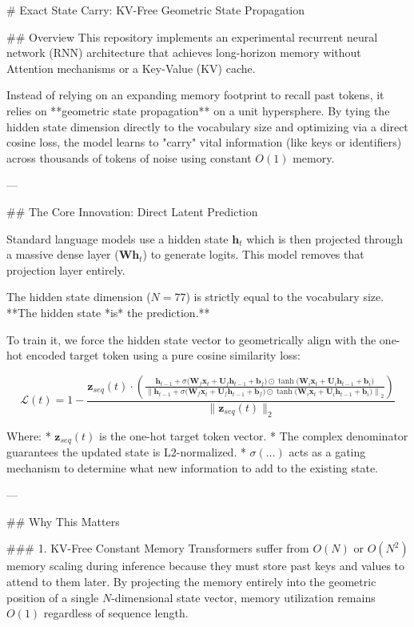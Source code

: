 # Exact State Carry: KV-Free Geometric State Propagation

## Overview
This repository implements an experimental recurrent neural network (RNN) architecture that achieves long-horizon memory without Attention mechanisms or a Key-Value (KV) cache. 

Instead of relying on an expanding memory footprint to recall past tokens, it relies on **geometric state propagation** on a unit hypersphere. By tying the hidden state dimension directly to the vocabulary size and optimizing via a direct cosine loss, the model learns to "carry" vital information (like keys or identifiers) across thousands of tokens of noise using constant $O(1)$ memory.

---

## The Core Innovation: Direct Latent Prediction

Standard language models use a hidden state $\mathbf{h}_t$ which is then projected through a massive dense layer ($\mathbf{W} \mathbf{h}_t$) to generate logits. This model removes that projection layer entirely. 

The hidden state dimension ($N=77$) is strictly equal to the vocabulary size. **The hidden state *is* the prediction.** 

To train it, we force the hidden state vector to geometrically align with the one-hot encoded target token using a pure cosine similarity loss:

$$ \mathcal{L}(t) = 1 - \frac{\mathbf{z}_{seq}(t) \cdot \left( \frac{\mathbf{h}_{t-1} + \sigma\Big( \mathbf{W}_f \mathbf{x}_t + \mathbf{U}_f \mathbf{h}_{t-1} + \mathbf{b}_f \Big) \odot \tanh\Big( \mathbf{W}_i \mathbf{x}_t + \mathbf{U}_i \mathbf{h}_{t-1} + \mathbf{b}_i \Big)}{\left\| \mathbf{h}_{t-1} + \sigma\Big( \mathbf{W}_f \mathbf{x}_t + \mathbf{U}_f \mathbf{h}_{t-1} + \mathbf{b}_f \Big) \odot \tanh\Big( \mathbf{W}_i \mathbf{x}_t + \mathbf{U}_i \mathbf{h}_{t-1} + \mathbf{b}_i \Big) \right\|_2} \right)}{\|\mathbf{z}_{seq}(t)\|_2} $$

Where:
*   $\mathbf{z}_{seq}(t)$ is the one-hot target token vector.
*   The complex denominator guarantees the updated state is L2-normalized.
*   $\sigma(\dots)$ acts as a gating mechanism to determine what new information to add to the existing state.

---

## Why This Matters

### 1. KV-Free Constant Memory
Transformers suffer from $O(N)$ or $O(N^2)$ memory scaling during inference because they must store past keys and values to attend to them later. By projecting the memory entirely into the geometric position of a single $N$-dimensional state vector, memory utilization remains $O(1)$ regardless of sequence length.


